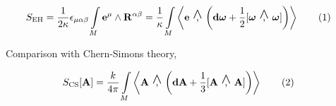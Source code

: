 \documentclass[a0,portrait]{a0poster}
\newcommand{\wedgecomma}{\stackon[1pt]{,}{\smash{\scriptsize$\wedge$}}}
\newcommand{\wedgecomm}[2]{\qty[ #1\ \wedgecomma\ #2 ]}
\newcommand\numberthis{\addtocounter{equation}{1}\tag{\theequation}}
\begin{document}
\begin{multicols}{2}






\begin{align}
    S_{\textnormal{EH}}&=\frac{1}{2\kappa}\epsilon_{\mu\alpha\beta}\int\limits_M\vb e^\mu\wedge \vb R^{\alpha\beta}=\frac{1}{\kappa}\int\limits_M\expval{\vb e\ \wedgecomma\ \qty(\vb d{\boldsymbol\omega}+\frac12\wedgecomm{\boldsymbol\omega}{\boldsymbol\omega})}\numberthis\label{EHAction4}
\end{align}

Comparison with Chern-Simons theory,

\begin{align}
    S_{\textnormal{CS}}\qty[\vb A]&=\frac{k}{4\pi}\int\limits_M\expval{\vb A\ \wedgecomma\ \qty(\vb d{\vb A}+\frac13\wedgecomm{\vb A}{\vb A})}\numberthis\label{YangMillsAction}
\end{align}


\end{multicols}
\end{document}
